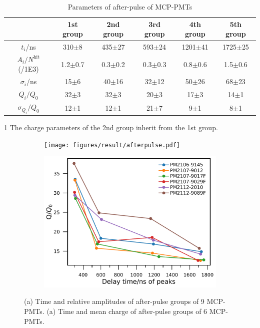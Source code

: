 \begin{table}
    \centering
    \caption{Parameters of after-pulse of MCP-PMTs}
    \label{tab:afterpulse}
    \begin{threeparttable}
        \begin{tabular}{c|c|c|c|c|c}
            \hline
            &1st group&2nd group&3rd group&4th group&5th group\\
            \hline
            $t_i$/ns&310$\pm$8&435$\pm$27&593$\pm$24&1201$\pm$41&1725$\pm$25\\
            $A_i/N^{\mathrm{hit}}$(/1E3)&1.2$\pm$0.7&0.3$\pm$0.2&0.3$\pm$0.3&0.8$\pm$0.6&1.5$\pm$0.6\\
            $\sigma_i$/ns&15$\pm$6&40$\pm$16 &32$\pm$12&50$\pm$26&68$\pm$23\\
            $Q_i/Q_0$&32$\pm$3&32$\pm$3\tnote{1}&20$\pm$3&17$\pm$3&14$\pm$1\\
            $\sigma_{Q_i}/Q_0$&12$\pm$1&12$\pm$1\tnote{1}&21$\pm$7&9$\pm$1&8$\pm$1\\
            \hline
        \end{tabular}
        \begin{tablenotes}
            \footnotesize
            \item[1] The charge parameters of the 2nd group inherit from the 1st group.
        \end{tablenotes}
    \end{threeparttable}
\end{table}

\begin{figure}[!htbp]
    \centering
    \begin{subfigure}[t]{\SF\textwidth}
        \texttt{[image: figures/result/afterpulse.pdf]}
        \caption{}%
        \label{fig:afterpulsePeak}
    \end{subfigure}
    \begin{subfigure}[t]{\SF\textwidth}
        \includegraphics[width=\textwidth]{figures/result/afterpulseQ.pdf}
        \caption{}%
        \label{fig:afterpulseQ}
    \end{subfigure}
    \caption{(a) Time and relative amplitudes of after-pulse groups of 9 MCP-PMTs. (a) Time and mean charge of after-pulse groups of 6 MCP-PMTs.}
\end{figure}

